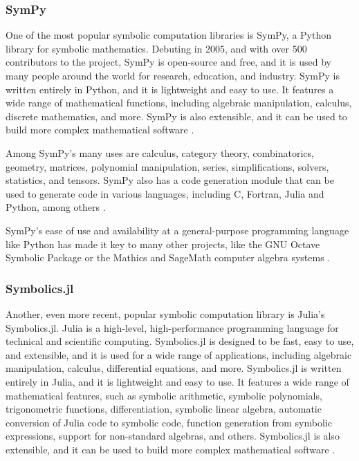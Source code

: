 \subsubsection{SymPy}\label{subsubsec:sympy}

One of the most popular symbolic computation libraries is SymPy, a Python library for symbolic mathematics. Debuting in 2005, and with over 500 contributors to the project, SymPy is open-source and free, and it is used by many people around the world for research, education, and industry. SymPy is written entirely in Python, and it is lightweight and easy to use. It features a wide range of mathematical functions, including algebraic manipulation, calculus, discrete mathematics, and more. SymPy is also extensible, and it can be used to build more complex mathematical software \parencite{meurer2017sympy}.

Among SymPy's many uses are calculus, category theory, combinatorics, geometry, matrices, polynomial manipulation, series, simplifications, solvers, statistics, and tensors. SymPy also has a code generation module that can be used to generate code in various languages, including C, Fortran, Julia and Python, among others \parencite{meurer2017sympy}.

SymPy's ease of use and availability at a general-purpose programming language like Python has made it key to many other projects, like the GNU Octave Symbolic Package or the Mathics and SageMath computer algebra systems \parencite{meurer2017sympy}.

\subsubsection{Symbolics.jl}\label{subsubsec:symbolics-jl}

Another, even more recent, popular symbolic computation library is Julia's Symbolics.jl. Julia is a high-level, high-performance programming language for technical and scientific computing. Symbolics.jl is designed to be fast, easy to use, and extensible, and it is used for a wide range of applications, including algebraic manipulation, calculus, differential equations, and more. Symbolics.jl is written entirely in Julia, and it is lightweight and easy to use. It features a wide range of mathematical features, such as symbolic arithmetic, symbolic polynomials, trigonometric functions, differentiation, symbolic linear algebra, automatic conversion of Julia code to symbolic code, function generation from symbolic expressions, support for non-standard algebras, and others. Symbolics.jl is also extensible, and it can be used to build more complex mathematical software \parencite{gowda2021high}. 

